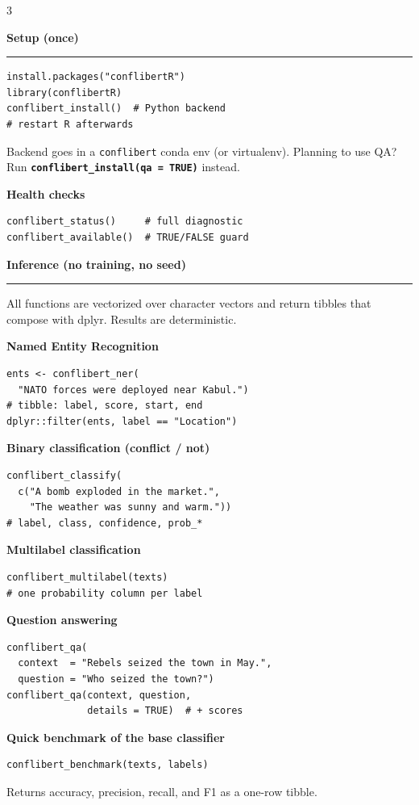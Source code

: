 \documentclass[8pt]{extarticle}
\newcommand{\cbsection}[1]{%
  \vspace{5pt}%
  {\color{cbnavy}\large\bfseries #1\par}\nointerlineskip\vspace{2.5pt}%
  {\color{cbamber}\rule{\linewidth}{1.6pt}\par}\vspace{2pt}%
}
\newcommand{\cbsub}[1]{{\color{cbred}\bfseries #1}\par}
\newcommand{\fn}[1]{\texttt{\bfseries\color{cbnavy}#1}}
\begin{document}
\begin{multicols}{3}

\cbsection{Setup (once)}
\begin{lstlisting}
install.packages("conflibertR")
library(conflibertR)
conflibert_install()  # Python backend
# restart R afterwards
\end{lstlisting}
Backend goes in a \texttt{conflibert} conda env (or virtualenv). Planning to use QA? Run \fn{conflibert\_install(qa = TRUE)} instead.

\cbsub{Health checks}
\begin{lstlisting}
conflibert_status()     # full diagnostic
conflibert_available()  # TRUE/FALSE guard
\end{lstlisting}

\cbsection{Inference (no training, no seed)}
All functions are vectorized over character vectors and return tibbles that compose with dplyr. Results are deterministic.

\cbsub{Named Entity Recognition}
\begin{lstlisting}
ents <- conflibert_ner(
  "NATO forces were deployed near Kabul.")
# tibble: label, score, start, end
dplyr::filter(ents, label == "Location")
\end{lstlisting}

\cbsub{Binary classification (conflict / not)}
\begin{lstlisting}
conflibert_classify(
  c("A bomb exploded in the market.",
    "The weather was sunny and warm."))
# label, class, confidence, prob_*
\end{lstlisting}

\cbsub{Multilabel classification}
\begin{lstlisting}
conflibert_multilabel(texts)
# one probability column per label
\end{lstlisting}

\cbsub{Question answering}
\begin{lstlisting}
conflibert_qa(
  context  = "Rebels seized the town in May.",
  question = "Who seized the town?")
conflibert_qa(context, question,
              details = TRUE)  # + scores
\end{lstlisting}

\cbsub{Quick benchmark of the base classifier}
\begin{lstlisting}
conflibert_benchmark(texts, labels)
\end{lstlisting}
Returns accuracy, precision, recall, and F1 as a one-row tibble.


\end{multicols}
\end{document}
